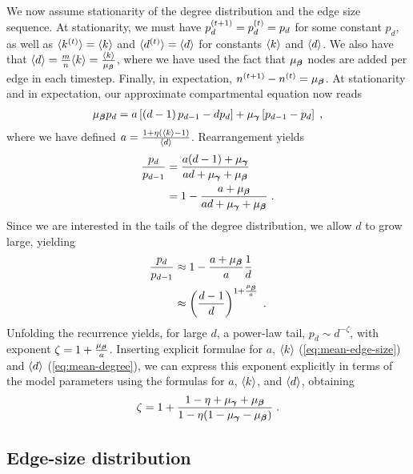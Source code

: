 We now assume stationarity of the degree distribution and the edge size sequence. 
At stationarity, we must have $p^{(t+1)}_d = p^{(t)}_d = p_d$ for some constant $p_d$, as well as $\langle k^{(t)} \rangle = \langle k \rangle$ and $\langle d^{(t)} \rangle = \langle d \rangle$ for constants $\langle k \rangle$ and $\langle d \rangle$. 
We also have that $\langle d \rangle = \frac{m}{n}\langle k \rangle = \frac{\langle k \rangle}{\mu_{\boldsymbol{\beta}}}$, where we have used the fact that $\mu_{\boldsymbol{\beta}}$ nodes are added per edge in each timestep. 
Finally, in expectation, $n^{(t+1)} - n^{(t)} = \mu_{\boldsymbol{\beta}}$.
At stationarity and in expectation, our approximate compartmental equation now reads 
\begin{align}
    \mu_{\boldsymbol{\beta}} p_d = a\left[\left(d-1\right)p_{d-1} - dp_d\right] + \mu_{\boldsymbol{\gamma}}\left[p_{d-1} - p_d\right]\;, \label{eq:stationary-rate-equation}
\end{align}
where we have defined $a = \frac{1 + \eta\left(\langle k \rangle-1\right)}{\langle d \rangle}$. 
Rearrangement yields 
\begin{align}
    \frac{p_d}{p_{d-1}} &= \frac{a(d-1) + \mu_{\boldsymbol{\gamma}}}{ad + \mu_{\boldsymbol{\gamma}} + \mu_{\boldsymbol{\beta}}} \\ 
    &= 1 - \frac{a + \mu_{\boldsymbol{\beta}}}{ad + \mu_{\boldsymbol{\gamma}} + \mu_{\boldsymbol{\beta}}}\;.
\end{align}
Since we are interested in the tails of the degree distribution, we allow $d$ to grow large, yielding 
\begin{align}
    \frac{p_d}{p_{d-1}} &\approx 1 - \frac{a + \mu_{\boldsymbol{\beta}}}{a}\frac{1}{d} \\ 
    &\approx \left(\frac{d-1}{d}\right)^{1 + \frac{\mu_{\boldsymbol{\beta}}}{a}}\;. 
\end{align}
Unfolding the recurrence yields, for large $d$, a power-law tail, $p_d\sim d^{-\zeta}$, with exponent $\zeta = 1 + \frac{\mu_{\boldsymbol{\beta}}}{a}$.
Inserting explicit formulae for $a$, $\langle k \rangle$ (\cref{eq:mean-edge-size}) and $\langle d \rangle$ (\cref{eq:mean-degree}), 
we can express this exponent explicitly in terms of the model parameters using the formulas for $a$, $\langle k \rangle$, and $\langle d \rangle$, obtaining 
\begin{align}
    \zeta = 1 + \frac{1 - \eta + \mu_{\boldsymbol{\gamma}} + \mu_{\boldsymbol{\beta}}}{1 - \eta(1 - \mu_{\boldsymbol{\gamma}} - \mu_{\boldsymbol{\beta}})}\;. \label{eq:power-law-exponent}
\end{align}


\subsection{Edge-size distribution} \label{sec:edge-sizes}

